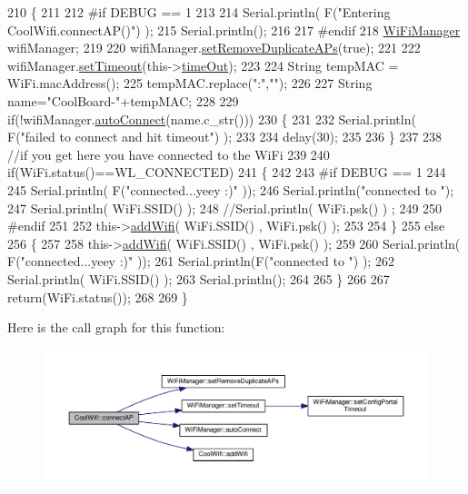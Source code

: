 \begin{DoxyCode}
210 \{
211 
212 \textcolor{preprocessor}{#if DEBUG == 1 }
213     
214     Serial.println( F(\textcolor{stringliteral}{"Entering CoolWifi.connectAP()"}) );   
215     Serial.println();
216 
217 \textcolor{preprocessor}{#endif}
218     \hyperlink{class_wi_fi_manager}{WiFiManager} wifiManager;
219     
220     wifiManager.\hyperlink{class_wi_fi_manager_a4dd1dbf4f22900f226a3897b88155212}{setRemoveDuplicateAPs}(\textcolor{keyword}{true});
221 
222     wifiManager.\hyperlink{class_wi_fi_manager_aa6493d59c284ff245edb767ff684756d}{setTimeout}(this->\hyperlink{class_cool_wifi_a952111605f25156588b5632caaba1c6f}{timeOut});
223     
224     String tempMAC = WiFi.macAddress();
225     tempMAC.replace(\textcolor{stringliteral}{":"},\textcolor{stringliteral}{""});
226 
227     String name=\textcolor{stringliteral}{"CoolBoard-"}+tempMAC;   
228 
229     \textcolor{keywordflow}{if}(!wifiManager.\hyperlink{class_wi_fi_manager_ae3cdfa6b02edcfe63d7da4f696b62136}{autoConnect}(name.c\_str())) 
230     \{
231 
232         Serial.println( F(\textcolor{stringliteral}{"failed to connect and hit timeout"}) );
233 
234         delay(30);
235 
236     \} 
237 
238     \textcolor{comment}{//if you get here you have connected to the WiFi}
239 
240     \textcolor{keywordflow}{if}(WiFi.status()==WL\_CONNECTED)
241     \{
242 
243 \textcolor{preprocessor}{    #if DEBUG == 1}
244 
245         Serial.println( F(\textcolor{stringliteral}{"connected...yeey :)"} ));
246         Serial.println(\textcolor{stringliteral}{"connected to "});
247         Serial.println( WiFi.SSID() );
248         \textcolor{comment}{//Serial.println( WiFi.psk() ) ;}
249         
250 \textcolor{preprocessor}{    #endif}
251 
252         this->\hyperlink{class_cool_wifi_a914d7a1df14dd6b75345fb614c34e9d6}{addWifi}( WiFi.SSID() , WiFi.psk() );
253         
254     \}
255     \textcolor{keywordflow}{else}
256     \{
257 
258         this->\hyperlink{class_cool_wifi_a914d7a1df14dd6b75345fb614c34e9d6}{addWifi}( WiFi.SSID() , WiFi.psk() );
259 
260         Serial.println( F(\textcolor{stringliteral}{"connected...yeey :)"} ));
261         Serial.println(F(\textcolor{stringliteral}{"connected to "}) );
262         Serial.println( WiFi.SSID() );
263         Serial.println();
264     
265     \}
266     
267     \textcolor{keywordflow}{return}(WiFi.status());
268 
269 \}
\end{DoxyCode}
Here is the call graph for this function\+:\nopagebreak
\begin{figure}[H]
\begin{center}
\leavevmode
\includegraphics[width=350pt]{d7/d29/class_cool_wifi_a7c857f27161782f5ef1d62d552aff971_cgraph}
\end{center}
\end{figure}
